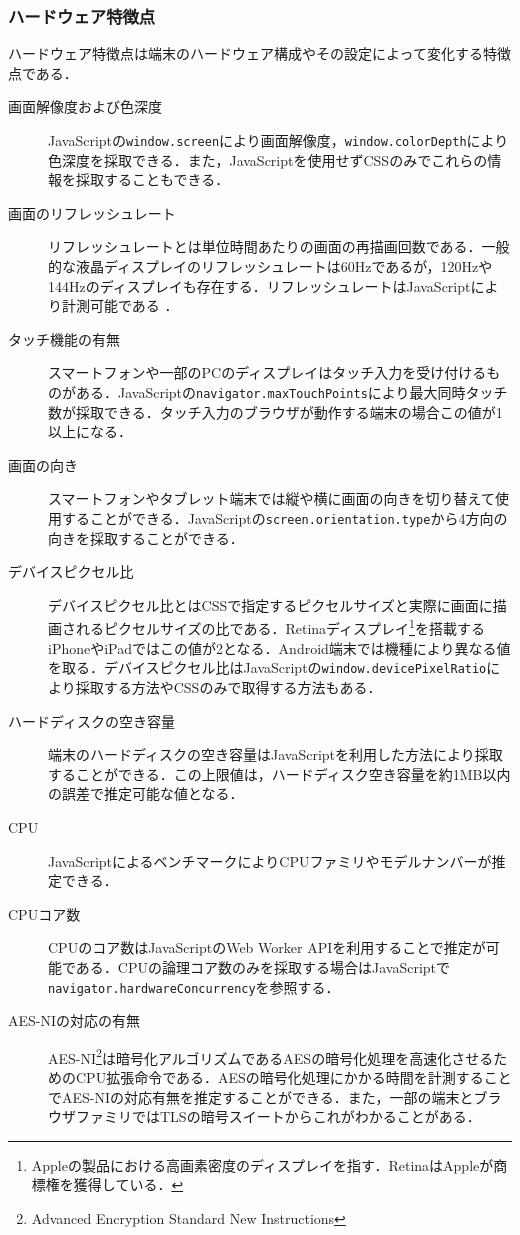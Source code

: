 \subsubsection{ハードウェア特徴点}
ハードウェア特徴点は端末のハードウェア構成やその設定によって変化する特徴点である．
\begin{description}
\item[画面解像度および色深度]JavaScriptの\texttt{window.screen}により画面解像度，\texttt{window.colorDepth}により色深度を採取できる．また，JavaScriptを使用せずCSSのみでこれらの情報を採取することもできる．
\item[画面のリフレッシュレート]リフレッシュレートとは単位時間あたりの画面の再描画回数である．一般的な液晶ディスプレイのリフレッシュレートは60Hzであるが，120Hzや144Hzのディスプレイも存在する．リフレッシュレートはJavaScriptにより計測可能である\cite{takasu2015survey} ．
\item[タッチ機能の有無]スマートフォンや一部のPCのディスプレイはタッチ入力を受け付けるものがある．JavaScriptの\texttt{navigator.maxTouchPoints}により最大同時タッチ数が採取できる．タッチ入力のブラウザが動作する端末の場合この値が1以上になる．
\item[画面の向き]スマートフォンやタブレット端末では縦や横に画面の向きを切り替えて使用することができる．JavaScriptの\texttt{screen.orientation.type}から4方向の向きを採取することができる．
\item[デバイスピクセル比]デバイスピクセル比とはCSSで指定するピクセルサイズと実際に画面に描画されるピクセルサイズの比である．Retinaディスプレイ\footnote{Appleの製品における高画素密度のディスプレイを指す．RetinaはAppleが商標権を獲得している．}を搭載するiPhoneやiPadではこの値が2となる．Android端末では機種により異なる値を取る．デバイスピクセル比はJavaScriptの\texttt{window.devicePixelRatio}により採取する方法やCSSのみで取得する方法もある\cite{takei2015web}．
\item[ハードディスクの空き容量]端末のハードディスクの空き容量はJavaScriptを利用した方法により採取することができる\cite{takasu2015survey}．この上限値は，ハードディスク空き容量を約1MB以内の誤差で推定可能な値となる．
\item[CPU]JavaScriptによるベンチマークによりCPUファミリやモデルナンバーが推定できる\cite{saito2017web}．
\item[CPUコア数]CPUのコア数はJavaScriptのWeb Worker APIを利用することで推定が可能である\cite{桐生直輝2014web}．CPUの論理コア数のみを採取する場合はJavaScriptで\texttt{navigator.hardwareConcurrency}を参照する．
\item[AES-NIの対応の有無]AES-NI\footnote{Advanced Encryption Standard New Instructions}は暗号化アルゴリズムであるAESの暗号化処理を高速化させるためのCPU拡張命令である．AESの暗号化処理にかかる時間を計測することでAES-NIの対応有無を推定することができる\cite{saito2016estimating}．また，一部の端末とブラウザファミリではTLSの暗号スイートからこれがわかることがある．

\end{description}
